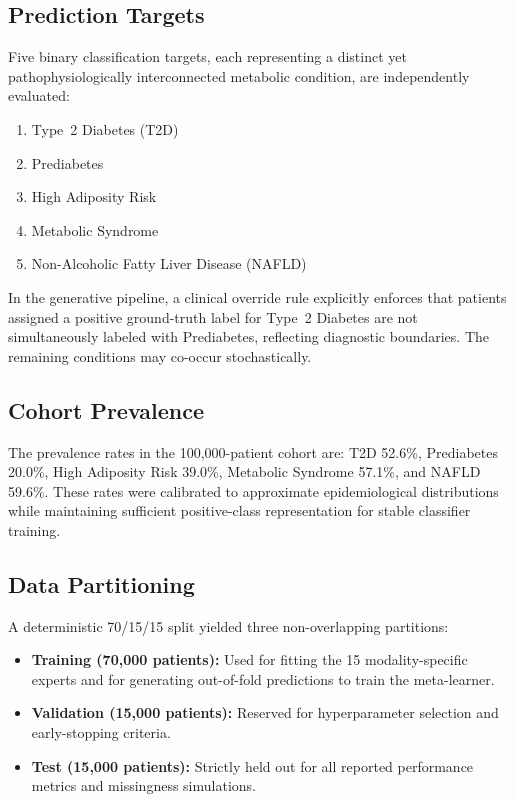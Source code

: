 \documentclass[10pt,twocolumn,letterpaper]{article}
\begin{document}
\subsection{Prediction Targets}
Five binary classification targets, each representing a distinct yet pathophysiologically interconnected metabolic condition, are independently evaluated:
\begin{enumerate}
    \item Type~2 Diabetes (T2D)
    \item Prediabetes
    \item High Adiposity Risk
    \item Metabolic Syndrome
    \item Non-Alcoholic Fatty Liver Disease (NAFLD)
\end{enumerate}
In the generative pipeline, a clinical override rule explicitly enforces that patients assigned a positive ground-truth label for Type~2 Diabetes are not simultaneously labeled with Prediabetes, reflecting diagnostic boundaries. The remaining conditions may co-occur stochastically.

\subsection{Cohort Prevalence}
The prevalence rates in the 100{,}000-patient cohort are: T2D 52.6\%, Prediabetes 20.0\%, High Adiposity Risk 39.0\%, Metabolic Syndrome 57.1\%, and NAFLD 59.6\%. These rates were calibrated to approximate epidemiological distributions while maintaining sufficient positive-class representation for stable classifier training.

\subsection{Data Partitioning}
A deterministic 70/15/15 split yielded three non-overlapping partitions:
\begin{itemize}
    \item \textbf{Training (70{,}000 patients):} Used for fitting the 15 modality-specific experts and for generating out-of-fold predictions to train the meta-learner.
    \item \textbf{Validation (15{,}000 patients):} Reserved for hyperparameter selection and early-stopping criteria.
    \item \textbf{Test (15{,}000 patients):} Strictly held out for all reported performance metrics and missingness simulations.
\end{itemize}
\end{document}
